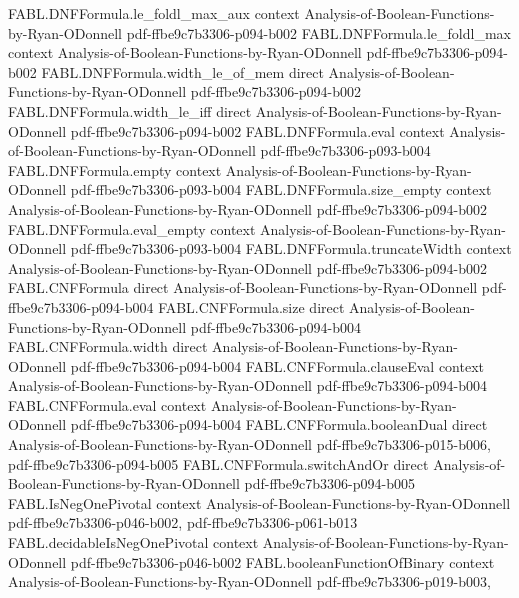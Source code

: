 \begin{theorem}
\proofstep
  {FABL.DNFFormula.le_foldl_max_aux}
  {context}
  {Analysis-of-Boolean-Functions-by-Ryan-ODonnell}
  {pdf-ffbe9c7b3306-p094-b002}
\proofstep
  {FABL.DNFFormula.le_foldl_max}
  {context}
  {Analysis-of-Boolean-Functions-by-Ryan-ODonnell}
  {pdf-ffbe9c7b3306-p094-b002}
\proofstep
  {FABL.DNFFormula.width_le_of_mem}
  {direct}
  {Analysis-of-Boolean-Functions-by-Ryan-ODonnell}
  {pdf-ffbe9c7b3306-p094-b002}
\proofstep
  {FABL.DNFFormula.width_le_iff}
  {direct}
  {Analysis-of-Boolean-Functions-by-Ryan-ODonnell}
  {pdf-ffbe9c7b3306-p094-b002}
\proofstep
  {FABL.DNFFormula.eval}
  {context}
  {Analysis-of-Boolean-Functions-by-Ryan-ODonnell}
  {pdf-ffbe9c7b3306-p093-b004}
\proofstep
  {FABL.DNFFormula.empty}
  {context}
  {Analysis-of-Boolean-Functions-by-Ryan-ODonnell}
  {pdf-ffbe9c7b3306-p093-b004}
\proofstep
  {FABL.DNFFormula.size_empty}
  {context}
  {Analysis-of-Boolean-Functions-by-Ryan-ODonnell}
  {pdf-ffbe9c7b3306-p094-b002}
\proofstep
  {FABL.DNFFormula.eval_empty}
  {context}
  {Analysis-of-Boolean-Functions-by-Ryan-ODonnell}
  {pdf-ffbe9c7b3306-p093-b004}
\proofstep
  {FABL.DNFFormula.truncateWidth}
  {context}
  {Analysis-of-Boolean-Functions-by-Ryan-ODonnell}
  {pdf-ffbe9c7b3306-p094-b002}
\proofstep
  {FABL.CNFFormula}
  {direct}
  {Analysis-of-Boolean-Functions-by-Ryan-ODonnell}
  {pdf-ffbe9c7b3306-p094-b004}
\proofstep
  {FABL.CNFFormula.size}
  {direct}
  {Analysis-of-Boolean-Functions-by-Ryan-ODonnell}
  {pdf-ffbe9c7b3306-p094-b004}
\proofstep
  {FABL.CNFFormula.width}
  {direct}
  {Analysis-of-Boolean-Functions-by-Ryan-ODonnell}
  {pdf-ffbe9c7b3306-p094-b004}
\proofstep
  {FABL.CNFFormula.clauseEval}
  {context}
  {Analysis-of-Boolean-Functions-by-Ryan-ODonnell}
  {pdf-ffbe9c7b3306-p094-b004}
\proofstep
  {FABL.CNFFormula.eval}
  {context}
  {Analysis-of-Boolean-Functions-by-Ryan-ODonnell}
  {pdf-ffbe9c7b3306-p094-b004}
\proofstep
  {FABL.CNFFormula.booleanDual}
  {direct}
  {Analysis-of-Boolean-Functions-by-Ryan-ODonnell}
  {pdf-ffbe9c7b3306-p015-b006,
    pdf-ffbe9c7b3306-p094-b005}
\proofstep
  {FABL.CNFFormula.switchAndOr}
  {direct}
  {Analysis-of-Boolean-Functions-by-Ryan-ODonnell}
  {pdf-ffbe9c7b3306-p094-b005}
\proofstep
  {FABL.IsNegOnePivotal}
  {context}
  {Analysis-of-Boolean-Functions-by-Ryan-ODonnell}
  {pdf-ffbe9c7b3306-p046-b002,
    pdf-ffbe9c7b3306-p061-b013}
\proofstep
  {FABL.decidableIsNegOnePivotal}
  {context}
  {Analysis-of-Boolean-Functions-by-Ryan-ODonnell}
  {pdf-ffbe9c7b3306-p046-b002}
\proofstep
  {FABL.booleanFunctionOfBinary}
  {context}
  {Analysis-of-Boolean-Functions-by-Ryan-ODonnell}
  {pdf-ffbe9c7b3306-p019-b003,
}
\end{theorem}
